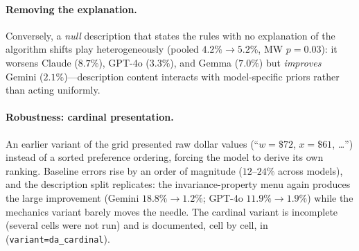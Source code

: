 \paragraph{Removing the explanation.} Conversely, a \emph{null} description that states the rules with no explanation of the algorithm shifts play heterogeneously (pooled $4.2\% \to 5.2\%$, MW $p = 0.03$): it worsens Claude ($8.7\%$), GPT-4o ($3.3\%$), and Gemma ($7.0\%$) but \emph{improves} Gemini ($2.1\%$)---description content interacts with model-specific priors rather than acting uniformly.

\paragraph{Robustness: cardinal presentation.} An earlier variant of the grid presented raw dollar values (``$w = \$72$, $x = \$61$, \ldots'') instead of a sorted preference ordering, forcing the model to derive its own ranking. Baseline errors rise by an order of magnitude ($12$--$24\%$ across models), and the description split replicates: the invariance-property menu again produces the large improvement (Gemini $18.8\% \to 1.2\%$; GPT-4o $11.9\% \to 1.9\%$) while the mechanics variant barely moves the needle. The cardinal variant is incomplete (several cells were not run) and is documented, cell by cell, in  (\texttt{variant=da\_cardinal}).
